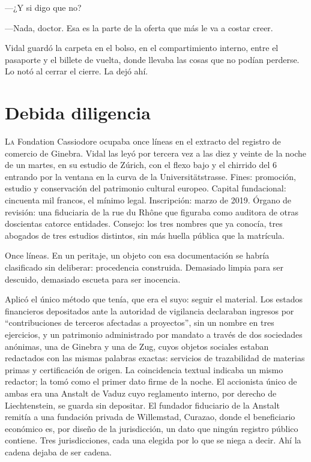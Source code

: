 ---¿Y si digo que no?

---Nada, doctor. Esa es la parte de la oferta que más le va a costar creer.

Vidal guardó la carpeta en el bolso, en el compartimiento interno, entre el pasaporte y el billete de vuelta, donde llevaba las cosas que no podían perderse. Lo notó al cerrar el cierre. La dejó ahí.

\clearpage

\chapter{Debida diligencia}

\lettrine[lines=2, lhang=0.1, nindent=0.2em]{L}{a} Fondation Cassiodore ocupaba once líneas en el extracto del registro de comercio de Ginebra. Vidal las leyó por tercera vez a las diez y veinte de la noche de un martes, en su estudio de Zúrich, con el flexo bajo y el chirrido del 6 entrando por la ventana en la curva de la Universitätstrasse. Fines: promoción, estudio y conservación del patrimonio cultural europeo. Capital fundacional: cincuenta mil francos, el mínimo legal. Inscripción: marzo de 2019. Órgano de revisión: una fiduciaria de la rue du Rhône que figuraba como auditora de otras doscientas catorce entidades. Consejo: los tres nombres que ya conocía, tres abogados de tres estudios distintos, sin más huella pública que la matrícula.


Once líneas. En un peritaje, un objeto con esa documentación se habría clasificado sin deliberar: procedencia construida. Demasiado limpia para ser descuido, demasiado escueta para ser inocencia.

Aplicó el único método que tenía, que era el suyo: seguir el material. Los estados financieros depositados ante la autoridad de vigilancia declaraban ingresos por ``contribuciones de terceros afectadas a proyectos'', sin un nombre en tres ejercicios, y un patrimonio administrado por mandato a través de dos sociedades anónimas, una de Ginebra y una de Zug, cuyos objetos sociales estaban redactados con las mismas palabras exactas: servicios de trazabilidad de materias primas y certificación de origen. La coincidencia textual indicaba un mismo redactor; la tomó como el primer dato firme de la noche. El accionista único de ambas era una Anstalt de Vaduz cuyo reglamento interno, por derecho de Liechtenstein, se guarda sin depositar. El fundador fiduciario de la Anstalt remitía a una fundación privada de Willemstad, Curazao, donde el beneficiario económico es, por diseño de la jurisdicción, un dato que ningún registro público contiene. Tres jurisdicciones, cada una elegida por lo que se niega a decir. Ahí la cadena dejaba de ser cadena.

